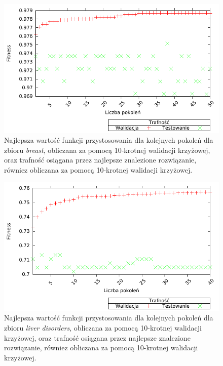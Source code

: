	\begin{figure}
		\includegraphics[scale=0.90]{figures/results/fitness/fitness-breast-CV}
		\caption{Najlepsza wartość funkcji przystosowania dla kolejnych pokoleń dla zbioru \emph{breast}, obliczana za pomocą 10-krotnej walidacji krzyżowej, oraz trafność osiągana przez najlepsze znalezione rozwiązanie, równiez obliczana za pomocą 10-krotnej walidacji krzyżowej. \label{fig:fit-breast-cv}}
	\end{figure}	 
               
   \begin{figure}
        \includegraphics[scale=0.90]{figures/results/fitness/fitness-liver-disorders-CV}
         \caption{Najlepsza wartość funkcji przystosowania dla kolejnych pokoleń dla zbioru \emph{liver disorders}, obliczana za pomocą 10-krotnej walidacji krzyżowej, oraz trafność osiągana przez najlepsze znalezione rozwiązanie, równiez obliczana za pomocą 10-krotnej walidacji krzyżowej.				\label{fig:fit-liver-disorders-cv}}
   \end{figure}    
	
